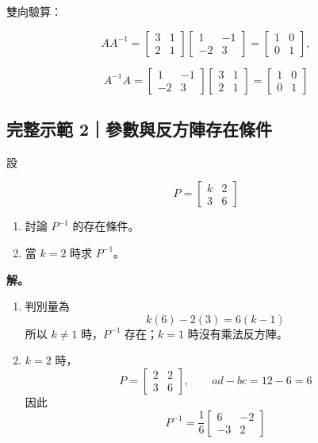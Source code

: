 \documentclass[11pt,a4paper]{article}
\providecommand{\tightlist}{%
  \setlength{\itemsep}{0pt}\setlength{\parskip}{0pt}}
\begin{document}
雙向驗算：

\[
AA^{-1}
=\begin{bmatrix}3&1\\2&1\end{bmatrix}
\begin{bmatrix}1&-1\\-2&3\end{bmatrix}
=\begin{bmatrix}1&0\\0&1\end{bmatrix},
\]

\[
A^{-1}A
=\begin{bmatrix}1&-1\\-2&3\end{bmatrix}
\begin{bmatrix}3&1\\2&1\end{bmatrix}
=\begin{bmatrix}1&0\\0&1\end{bmatrix}
\]

\subsection{完整示範 2｜參數與反方陣存在條件}\label{ux5b8cux6574ux793aux7bc4-2ux53c3ux6578ux8207ux53cdux65b9ux9663ux5b58ux5728ux689dux4ef6}

設

\[
P=\begin{bmatrix}k&2\\3&6\end{bmatrix}
\]

\begin{enumerate}
\def\labelenumi{\arabic{enumi}.}
\tightlist
\item
  討論 \(P^{-1}\) 的存在條件。
\item
  當 \(k=2\) 時求 \(P^{-1}\)。
\end{enumerate}

\textbf{解。}

\begin{enumerate}
\def\labelenumi{\arabic{enumi}.}
\item
  判別量為
  \[k(6)-2(3)=6(k-1)\]
  所以 \(k\ne1\) 時，\(P^{-1}\) 存在；\(k=1\) 時沒有乘法反方陣。
\item
  \(k=2\) 時，
  \[
  P=\begin{bmatrix}2&2\\3&6\end{bmatrix},
  \qquad ad-bc=12-6=6
  \]
  因此
  \[
  P^{-1}=\frac16\begin{bmatrix}6&-2\\-3&2\end{bmatrix}
  \]
\end{enumerate}
\end{document}
